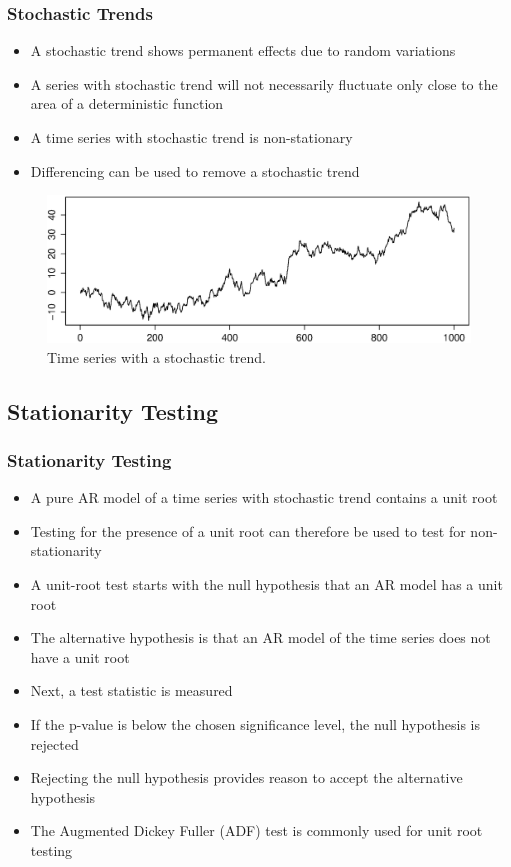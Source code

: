 \documentclass[presentation]{beamer}
\begin{document}
\begin{frame}[t]
\frametitle{Stochastic Trends}
\footnotesize{
\begin{itemize}
\item{A stochastic trend shows permanent effects due to random variations}
\item{A series with stochastic trend will not necessarily fluctuate only close to the area of a deterministic function}
\item{A time series with stochastic trend is non-stationary}
\item{Differencing can be used to remove a stochastic trend}
\end{itemize}
}
\vspace{-.2cm}
\begin{figure}[htbp]
\begin{center}
\includegraphics[width=\textwidth]{assets/stochastic_trend.eps}
\caption{Time series with a stochastic trend.}
\end{center}
\end{figure}
\end{frame}

\subsection{Stationarity Testing}

\begin{frame}[t]
\frametitle{Stationarity Testing}
\footnotesize{
\begin{itemize}
\item{A pure AR model of a time series with stochastic trend contains a unit root \cite{franses1998time}}
\item{Testing for the presence of a unit root can therefore be used to test for non-stationarity}
\item{A unit-root test starts with the null hypothesis that an AR model has a unit root}
\item{The alternative hypothesis is that an AR model of the time series does not have a unit root}
\item{Next, a test statistic is measured}
\item{If the p-value is below the chosen significance level, the null hypothesis is rejected}
\item{Rejecting the null hypothesis provides reason to accept the alternative hypothesis}
\item{The Augmented Dickey Fuller (ADF) test is commonly used for unit root testing}
\end{itemize}
}
\end{frame}
\end{document}
